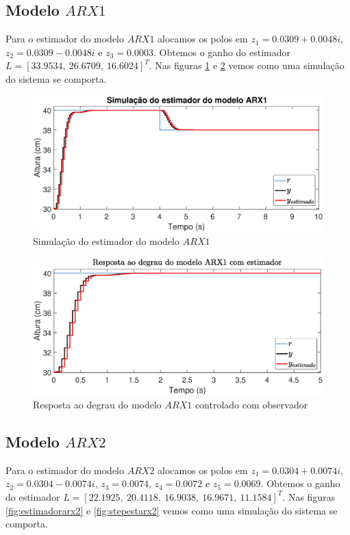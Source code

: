 \subsection{Modelo $ARX1$}
Para o estimador do modelo $ARX1$ alocamos os polos em $z_1=0.0309 + 0.0048i$, $z_2=0.0309 - 0.0048i$ e $z_3=0.0003$. Obtemos o ganho do estimador $L=[33.9534,~26.6709,~16.6024]^T$. Nas figuras \ref{fig:estimadorarx1} e \ref{fig:stepestarx1} vemos como uma simulação do sistema se comporta.

\begin{figure}[H]
	\centering
	\includegraphics[width=1\linewidth]{estimadorarx1}
	\caption[Simulação do estimador do modelo $ARX1$]{Simulação do estimador do modelo $ARX1$}
	\label{fig:estimadorarx1}
\end{figure}

\begin{figure}[H]
	\centering
	\includegraphics[width=1\linewidth]{stepestarx1}
	\caption[Resposta ao degrau do modelo $ARX1$ controlado com observador]{Resposta ao degrau do modelo $ARX1$ controlado com observador}
	\label{fig:stepestarx1}
\end{figure}

\subsection{Modelo $ARX2$}
Para o estimador do modelo $ARX2$ alocamos os polos em $z_1=0.0304 + 0.0074i$, $z_2=0.0304 - 0.0074i$, $z_3=0.0074$, $z_4=0.0072$ e $z_5=0.0069$. Obtemos o ganho do estimador $L=[22.1925,~20.4118,~ 16.9038,~16.9671,~11.1584]^T$. Nas figuras \ref{fig:estimadorarx2} e \ref{fig:stepestarx2} vemos como uma simulação do sistema se comporta.

